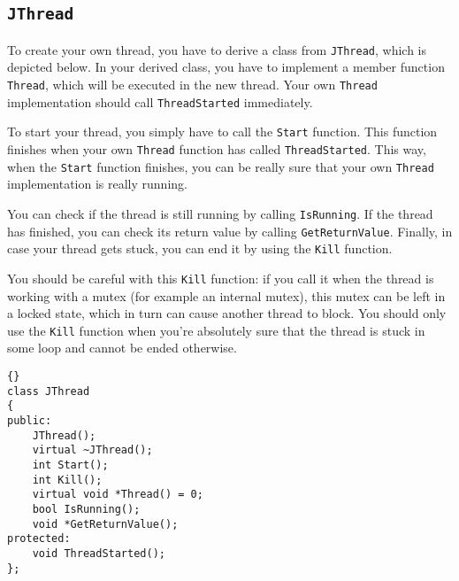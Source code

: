 \documentclass[a4paper,12pt]{article}
\begin{document}
	\subsection{{\tt JThread}}
	
	To create your own thread, you have to derive a class from {\tt JThread},
	which is depicted below. In your derived class, you have to implement
	a member function {\tt Thread}, which will be executed in the new thread.
	Your own {\tt Thread} implementation should call {\tt ThreadStarted}
	immediately.

	To start your thread, you simply have to call the {\tt Start} function.
	This function finishes when your own {\tt Thread} function has called
	{\tt ThreadStarted}. This way, when the {\tt Start} function
	finishes, you can be really sure that your own {\tt Thread} implementation
	is really running.

	You can check if the thread is still running by calling {\tt IsRunning}.
	If the thread has finished, you can check its return value by calling
	{\tt GetReturnValue}. Finally, in case your thread gets stuck, you can
	end it by using the {\tt Kill} function.

	You should be careful with this {\tt Kill} function: if you call it when
	the thread is working with a mutex (for example an internal mutex), this
	mutex can be left in a locked state, which in turn can cause another thread
	to block. You should only use the {\tt Kill} function when you're absolutely
	sure that the thread is stuck in some loop and cannot be ended otherwise.

\begin{lstlisting}[frame=tb]{}
class JThread
{
public:
	JThread();
	virtual ~JThread();
	int Start();
	int Kill();
	virtual void *Thread() = 0;
	bool IsRunning();
	void *GetReturnValue();
protected:
	void ThreadStarted();
};
\end{lstlisting}
	
\end{document}
